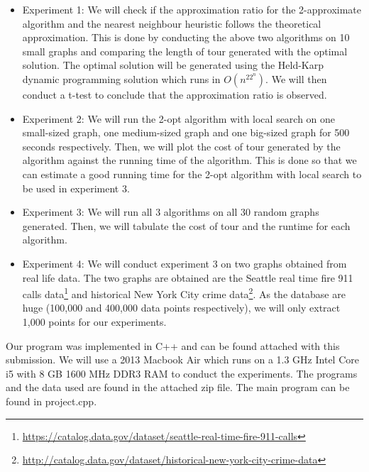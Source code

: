 \documentclass[paper=a4, fontsize=11pt]{scrartcl}	%
\numberwithin{equation}{section}		%
\numberwithin{figure}{section}			%
\numberwithin{table}{section}				%
\begin{document}
\begin{itemize}
\item Experiment 1: We will check if the approximation ratio for the 2-approximate algorithm and the nearest neighbour heuristic follows the theoretical approximation. This is done by conducting the above two algorithms on 10 small graphs and comparing the length of tour generated with the optimal solution. The optimal solution will be generated using the Held-Karp dynamic programming solution which runs in $O(n^22^n)$. We will then conduct a t-test to conclude that the approximation ratio is observed.
\item Experiment 2: We will run the 2-opt algorithm with local search on one small-sized graph, one medium-sized graph and one big-sized graph for 500 seconds respectively. Then, we will plot the cost of tour generated by the algorithm against the running time of the algorithm. This is done so that we can estimate a good running time for the 2-opt algorithm with local search to be used in experiment 3.
\item Experiment 3: We will run all 3 algorithms on all 30 random graphs generated. Then, we will tabulate the cost of tour and the runtime for each algorithm.
\item Experiment 4: We will conduct experiment 3 on two graphs obtained from real life data. The two graphs are obtained are the Seattle real time fire 911 calls data\footnote{\url{https://catalog.data.gov/dataset/seattle-real-time-fire-911-calls}} and historical New York City crime data\footnote{\url{http://catalog.data.gov/dataset/historical-new-york-city-crime-data}}. As the database are huge (100,000 and 400,000 data points respectively), we will only extract 1,000 points for our experiments.
\end{itemize}

Our program was implemented in C++ and can be found attached with this submission. We will use a 2013 Macbook Air which runs on a 1.3 GHz Intel Core i5 with 8 GB 1600 MHz DDR3 RAM to conduct the experiments. The programs and the data used are found in the attached zip file. The main program can be found in project.cpp.
\end{document}
